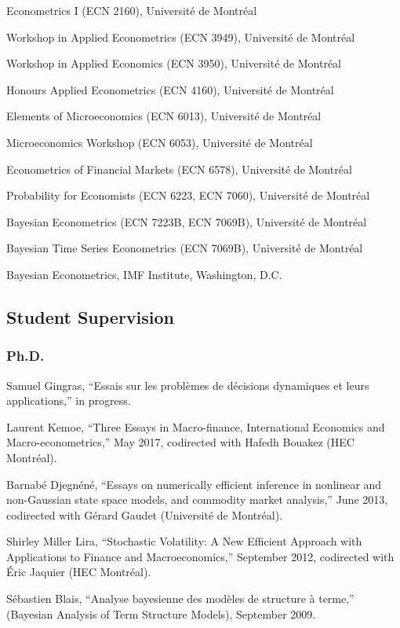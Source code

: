 \documentclass[12pt]{article}
\begin{document}
Econometrics I (ECN 2160), Universit\'e de Montr\'eal

Workshop in Applied Econometrics (ECN 3949), Universit\'e de Montr\'eal

Workshop in Applied Economics (ECN 3950), Universit\'e de Montr\'eal

Honours Applied Econometrics (ECN 4160), Universit\'e de Montr\'eal

Elements of Microeconomics (ECN 6013), Universit\'e de Montr\'eal

Microeconomics Workshop (ECN 6053), Universit\'e de Montr\'eal

Econometrics of Financial Markets (ECN 6578), Universit\'e de Montr\'eal

Probability for Economists (ECN 6223, ECN 7060), Universit\'e de Montr\'eal

Bayesian Econometrics (ECN 7223B, ECN 7069B), Universit\'e de Montr\'eal

Bayesian Time Series Econometrics (ECN 7069B), Universit\'e de Montr\'eal

Bayesian Econometrics, IMF Institute, Washington, D.C.

\subsection*{Student Supervision}

\subsubsection*{Ph.D.}

Samuel Gingras, ``Essais sur les probl\`emes de d\'ecisions dynamiques et leurs applications,''
in progress.

Laurent Kemoe, ``Three Essays in Macro-finance, International Economics and Macro-econometrics,''
May 2017, codirected with Hafedh Bouakez (HEC Montr\'eal).

Barnab\'e Djegn\'en\'e,
``Essays on numerically efficient inference in nonlinear and non-Gaussian state space models, and commodity market analysis,''
June 2013, codirected with G\'erard Gaudet (Universit\'e de Montr\'eal).

Shirley Miller Lira,
``Stochastic Volatility: A New Efficient Approach with Applications to Finance and Macroeconomics,''
September 2012, codirected with \'Eric Jaquier (HEC Montr\'eal).

S\'ebastien Blais,
``Analyse bayesienne des mod\`eles de structure \`a terme,''
(Bayesian Analysis of Term Structure Models),
September 2009.
\end{document}
